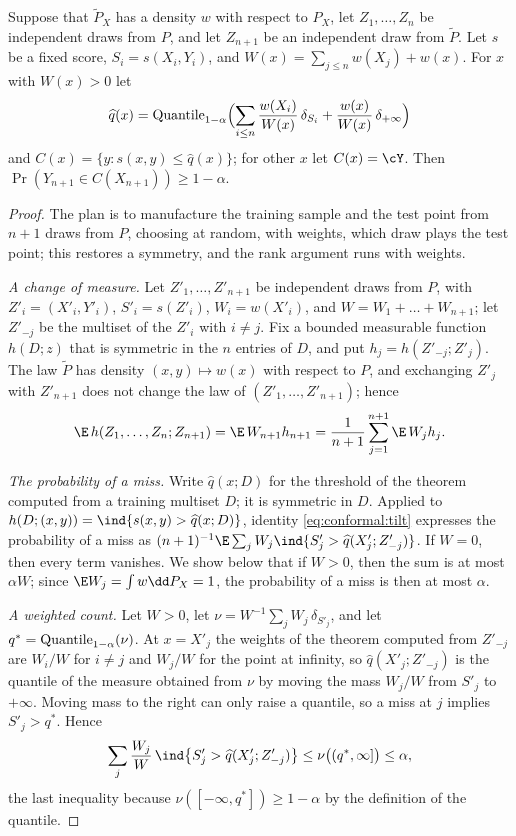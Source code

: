 \begin{refsection}
\begin{theorem}\label{thm:conformal:weighted}
Suppose that $\widetilde P_X$ has a density $w$ with respect to $P_X$, let $Z_1,\dots,Z_n$ be independent draws from $P$, and let $Z_{n+1}$ be an independent draw from $\widetilde P$. Let $s$ be a fixed score, $S_i=s(X_i,Y_i)$, and $W(x)=\sum_{j\le n}w(X_j)+w(x)$. For $x$ with $W(x)>0$ let
\[
\widehat q(x)=\operatorname{Quantile}_{1-\alpha}\Bigl(\sum_{i\le n}\frac{w(X_i)}{W(x)}\,\delta_{S_i}+\frac{w(x)}{W(x)}\,\delta_{+\infty}\Bigr)
\]
and $C(x)=\{y : s(x,y)\le\widehat q(x)\}$; for other $x$ let $C(x)=\cY$. Then $\Pr(Y_{n+1}\in C(X_{n+1}))\ge1-\alpha$.
\end{theorem}

\begin{proof}
The plan is to manufacture the training sample and the test point from $n+1$ draws from $P$, choosing at random, with weights, which draw plays the test point; this restores a symmetry, and the rank argument runs with weights.

\emph{A change of measure.} Let $Z'_1,\dots,Z'_{n+1}$ be independent draws from $P$, with $Z'_i=(X'_i,Y'_i)$, $S'_i=s(Z'_i)$, $W_i=w(X'_i)$, and $W=W_1+\dots+W_{n+1}$; let $Z'_{-j}$ be the multiset of the $Z'_i$ with $i\ne j$. Fix a bounded measurable function $h(D;z)$ that is symmetric in the $n$ entries of $D$, and put $h_j=h(Z'_{-j};Z'_j)$. The law $\widetilde P$ has density $(x,y)\mapsto w(x)$ with respect to $P$, and exchanging $Z'_j$ with $Z'_{n+1}$ does not change the law of $(Z'_1,\dots,Z'_{n+1})$; hence
\begin{equation}\label{eq:conformal:tilt}
\E\,h(Z_1,\dots,Z_n;Z_{n+1})=\E\,W_{n+1}h_{n+1}=\frac{1}{n+1}\sum_{j=1}^{n+1}\E\,W_jh_j.
\end{equation}

\emph{The probability of a miss.} Write $\widehat q(x;D)$ for the threshold of the theorem computed from a training multiset $D$; it is symmetric in $D$. Applied to $h(D;(x,y))=\ind\{s(x,y)>\widehat q(x;D)\}$, identity \eqref{eq:conformal:tilt} expresses the probability of a miss as $(n+1)^{-1}\E\sum_jW_j\ind\{S'_j>\widehat q(X'_j;Z'_{-j})\}$. If $W=0$, then every term vanishes. We show below that if $W>0$, then the sum is at most $\alpha W$; since $\E W_j=\int w\dd P_X=1$, the probability of a miss is then at most $\alpha$.

\emph{A weighted count.} Let $W>0$, let $\nu=W^{-1}\sum_jW_j\,\delta_{S'_j}$, and let $q^*=\operatorname{Quantile}_{1-\alpha}(\nu)$. At $x=X'_j$ the weights of the theorem computed from $Z'_{-j}$ are $W_i/W$ for $i\ne j$ and $W_j/W$ for the point at infinity, so $\widehat q(X'_j;Z'_{-j})$ is the quantile of the measure obtained from $\nu$ by moving the mass $W_j/W$ from $S'_j$ to $+\infty$. Moving mass to the right can only raise a quantile, so a miss at $j$ implies $S'_j>q^*$. Hence
\[
\sum_{j}\frac{W_j}{W}\,\ind\bigl\{S'_j>\widehat q(X'_j;Z'_{-j})\bigr\}\le\nu\bigl((q^*,\infty]\bigr)\le\alpha,
\]
the last inequality because $\nu([-\infty,q^*])\ge1-\alpha$ by the definition of the quantile.
\end{proof}


\end{refsection}
